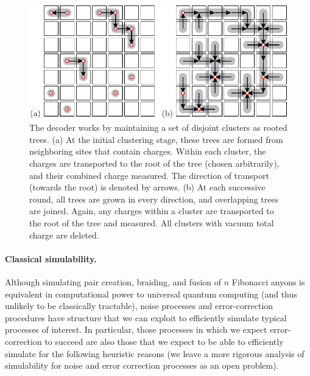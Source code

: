 \documentclass[aps, prl, letterpaper, twocolumn, superscriptaddress, notitlepage, 10pt]{revtex4-1}
\begin{document}
\begin{figure}[t!]
\begin{center}
	\includegraphics[width=1.0\columnwidth]{pic-decode.pdf}
\caption{The decoder works by maintaining a set of disjoint clusters as rooted trees.
(a) At the initial clustering stage, these trees are formed 
from neighboring sites that contain charges. Within each cluster, the 
charges are transported to the root of the tree (chosen 
arbitrarily), and their combined charge measured. The direction of transport 
(towards the root) is denoted by arrows.
(b) At each successive round, all trees are grown in 
every direction, and overlapping trees are joined. Again, any charges 
within a cluster are transported to the root of the 
tree and measured. All clusters with vacuum total charge are deleted.
\label{f:decode}
}
\end{center}
\vspace{-10pt}
\end{figure}

\paragraph{Classical simulability.}

Although simulating pair creation, braiding, and fusion of $n$ Fibonacci anyons is equivalent 
in computational power to universal quantum computing (and thus unlikely to be classically 
tractable), noise processes and error-correction procedures have structure that we can 
exploit to efficiently simulate typical processes of interest. In particular, those 
processes in which we expect error-correction to succeed are also those that we expect to 
be able to efficiently simulate for the following heuristic reasons 
(we leave a more rigorous analysis of simulability for noise 
and error correction processes as an open problem).
\end{document}
